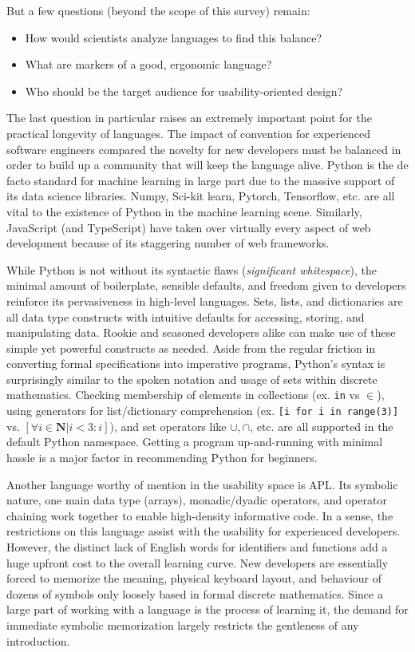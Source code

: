 \documentclass{article}
\begin{document}
But a few questions (beyond the scope of this survey) remain:
\begin{itemize}
    \item How would scientists analyze languages to find this balance?
    \item What are markers of a good, ergonomic language?
    \item Who should be the target audience for usability-oriented design?
\end{itemize}
The last question in particular raises an extremely important point for the practical longevity of languages.
The impact of convention for experienced software engineers compared the novelty for new developers
must be balanced in order to build up a community that will keep the language alive. Python is the de facto
standard for machine learning in large part due to the massive support of its data science libraries.
Numpy, Sci-kit learn, Pytorch, Tensorflow, etc. are all vital to the existence of Python in the machine learning scene.
Similarly, JavaScript (and TypeScript) have taken over virtually every aspect of web development because
of its staggering number of web frameworks.

While Python is not without its syntactic flaws (\textit{significant whitespace}),
the minimal amount of boilerplate, sensible defaults, and freedom given to developers
reinforce its pervasiveness in high-level languages. Sets, lists, and dictionaries are all data type
constructs with intuitive defaults for accessing, storing, and manipulating data.
Rookie and seasoned developers alike can make use of these simple yet powerful constructs as needed.
Aside from the regular friction in converting formal specifications into imperative programs,
Python's syntax is surprisingly similar to the spoken notation and usage of sets within discrete mathematics.
Checking membership of elements in collections (ex. \texttt{in} vs $\in$),
using generators for list/dictionary comprehension (ex. \texttt{[i for i in range(3)]} vs. $[\forall i \in \mathbf{N} | i < 3:i]$),
and set operators like $\cup, \cap$, etc. are all supported in the default Python namespace.
Getting a program up-and-running with minimal hassle is a major factor in recommending Python for beginners.

Another language worthy of mention in the usability space is APL. Its symbolic nature, one main data type (arrays),
monadic/dyadic operators, and operator chaining work together to enable high-density informative code.
In a sense, the restrictions on this language assist with the usability for experienced developers.
However, the distinct lack of English words for identifiers and functions add a huge upfront cost to the overall
learning curve. New developers are essentially forced to memorize the meaning, physical keyboard layout, and behaviour
of dozens of symbols only loosely based in formal discrete mathematics. Since a large part of working with a language
is the process of learning it, the demand for immediate symbolic memorization largely restricts the gentleness
of any introduction.
\end{document}
